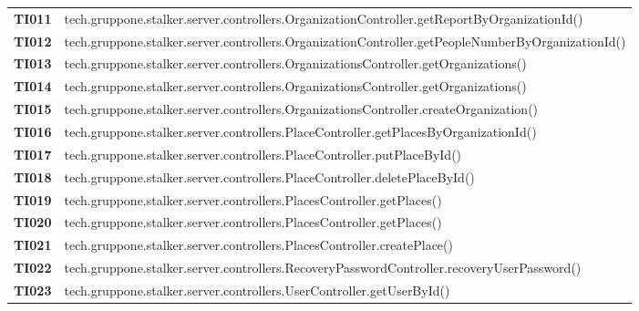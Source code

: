 \documentclass[../../piano-di-qualifica.tex]{subfiles}
\begin{document}
\begin{longtable}[H]{>{\centering\bfseries}m{3cm} >{}m{13cm}}
  TI011               & tech.gruppone.stalker.server.controllers.OrganizationController.getReportByOrganizationId\@()             \\

  TI012               & tech.gruppone.stalker.server.controllers.OrganizationController.getPeopleNumberByOrganizationId\@()       \\

  TI013               & tech.gruppone.stalker.server.controllers.OrganizationsController.getOrganizations\@()                     \\

  TI014               & tech.gruppone.stalker.server.controllers.OrganizationsController.getOrganizations\@()                     \\

  TI015               & tech.gruppone.stalker.server.controllers.OrganizationsController.createOrganization\@()                   \\

  TI016               & tech.gruppone.stalker.server.controllers.PlaceController.getPlacesByOrganizationId\@()                    \\

  TI017               & tech.gruppone.stalker.server.controllers.PlaceController.putPlaceById\@()                                 \\

  TI018               & tech.gruppone.stalker.server.controllers.PlaceController.deletePlaceById\@()                              \\

  TI019               & tech.gruppone.stalker.server.controllers.PlacesController.getPlaces\@()                                   \\

  TI020               & tech.gruppone.stalker.server.controllers.PlacesController.getPlaces\@()                                   \\

  TI021               & tech.gruppone.stalker.server.controllers.PlacesController.createPlace\@()                                 \\

  TI022               & tech.gruppone.stalker.server.controllers.RecoveryPasswordController.recoveryUserPassword\@()              \\

  TI023               & tech.gruppone.stalker.server.controllers.UserController.getUserById\@()                                   \\


\end{longtable}
\end{document}
